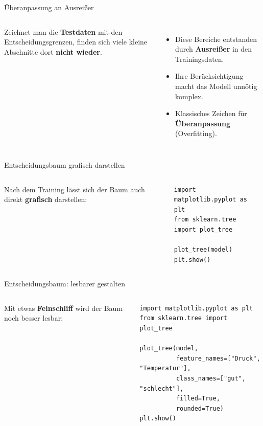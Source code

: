 \begin{frame}{Überanpassung an Ausreißer}
\begin{columns}
\centering


Zeichnet man die \textbf{Testdaten} mit den Entscheidungsgrenzen, finden
sich viele kleine Abschnitte dort \textbf{nicht wieder}.

\vspace{0.4em}
\begin{itemize}
  \item Diese Bereiche entstanden durch \textbf{Ausreißer} in den
        Trainingsdaten.
  \item Ihre Berücksichtigung macht das Modell unnötig komplex.
  \item[$\Rightarrow$] Klassisches Zeichen für \textbf{Überanpassung}
        (Overfitting).
\end{itemize}
\end{columns}
\end{frame}


\begin{frame}[fragile]{Entscheidungsbaum grafisch darstellen}
\begin{columns}
\footnotesize
Nach dem Training lässt sich der Baum auch direkt \textbf{grafisch}
darstellen:

\vspace{0.4em}
\begin{verbatim}
import matplotlib.pyplot as plt
from sklearn.tree import plot_tree

plot_tree(model)
plt.show()
\end{verbatim}

\centering

\end{columns}
\end{frame}

\begin{frame}[fragile]{Entscheidungsbaum: lesbarer gestalten}
\begin{columns}
\footnotesize
Mit etwas \textbf{Feinschliff} wird der Baum noch besser lesbar:

\vspace{0.4em}
\begin{verbatim}
import matplotlib.pyplot as plt
from sklearn.tree import plot_tree

plot_tree(model,
          feature_names=["Druck", "Temperatur"],
          class_names=["gut", "schlecht"],
          filled=True,
          rounded=True)
plt.show()
\end{verbatim}

\centering

\end{columns}
\end{frame}

